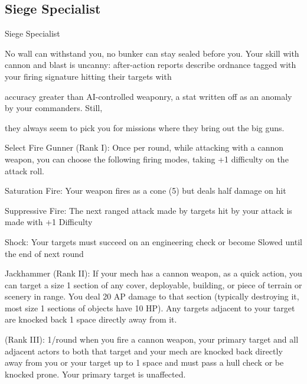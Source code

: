 \subsection{Siege Specialist}

                                             Siege Specialist

No wall can withstand you, no bunker can stay sealed before you. Your skill with cannon and blast is
uncanny: after-action reports describe ordnance tagged with your firing signature hitting their targets with

accuracy greater than AI-controlled weaponry, a stat written off as an anomaly by your commanders. Still,

they always seem to pick you for missions where they bring out the big guns.

Select Fire Gunner (Rank I): Once per round, while attacking with a cannon weapon, you can
choose the following firing modes, taking +1 difficulty on the attack roll.

         Saturation Fire: Your weapon fires as a cone (5) but deals half damage on hit





         Suppressive Fire: The next ranged attack made by targets hit by your attack is made with
         +1 Difficulty

         Shock: Your targets must succeed on an engineering check or become Slowed until the
         end of next round

Jackhammer (Rank II): If your mech has a cannon weapon, as a quick action, you can target a
size 1 section of any cover, deployable, building, or piece of terrain or scenery in range. You deal
20 AP damage to that section (typically destroying it, most size 1 sections of objects have 10
HP). Any targets adjacent to your target are knocked back 1 space directly away from it.

(Rank III): 1/round when you fire a cannon weapon, your primary target and all adjacent actors to
both that target and your mech are knocked back directly away from you or your target up to 1
space and must pass a hull check or be knocked prone. Your primary target is unaffected.

